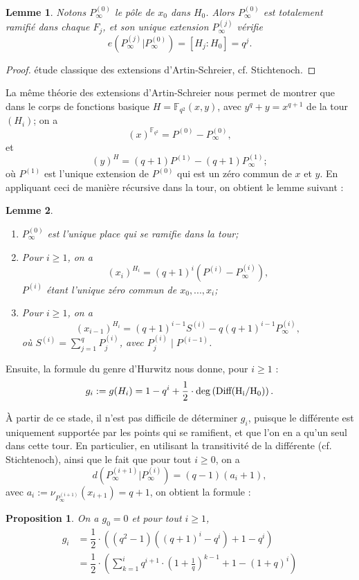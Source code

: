 \documentclass[10pt]{article}
\newtheorem{prop1}{Proposition}[]
\newtheorem{lem1}{Lemme}[]
\newcommand{\cd}{\cdot}
\begin{document}
\begin{lem1}
Notons $P_{\infty}^{(0)}$ le pôle de $x_0$ dans $H_0$. Alors $P_{\infty}^{(0)}$ est totalement ramifié dans chaque $F_j$, et son unique extension $P_{\infty}^{(j)}$ vérifie 
\[e(P_{\infty}^{(j)}|P_{\infty}^{(0)}) = [H_j:H_0]=q^j.\]
\end{lem1}

\begin{proof}
étude classique des extensions d'Artin-Schreier, cf. Stichtenoch.
\end{proof}

La même théorie des extensions d'Artin-Schreier nous permet de montrer que dans le corps de fonctions basique $H=\mathbb{F}_{q^2}(x,y)$, avec $y^q+y=x^{q+1}$ de la tour $(H_i)$; on a 
\[(x)^{\mathbb{F}_{q^2}} = P^{(0)} - P^{(0)}_{\infty},\]
et
\[(y)^H = (q+1)P^{(1)} - (q+1)P^{(1)}_{\infty};\]
où $P^{(1)}$ est l'unique extension de $P^{(0)}$ qui est un zéro commun de $x$ et $y$.
En appliquant ceci de manière récursive dans la tour, on obtient le lemme suivant :

\begin{lem1}
\begin{enumerate}
\item $P_{\infty}^{(0)}$ est l'unique place qui se ramifie dans la tour;
\item Pour $i \geq 1$, on a 
\[(x_i)^{H_i} = (q+1)^i \left(P^{(i)} - P_{\infty}^{(i)}\right),\]
$P^{(i)}$ étant l'unique zéro commun de $x_0,...,x_i$;
\item Pour $i \geq 1$, on a 
\[(x_{i-1})^{H_i} = (q+1)^{i-1}S^{(i)} - q(q+1)^{i-1}P_{\infty}^{(i)},\]
où $S^{(i)} = \sum\limits_{j=1}^q P_j^{(i)}$, avec $P_j^{(i)} \mid P^{(i-1)}$.
\end{enumerate}
\end{lem1}

Ensuite, la formule du genre d'Hurwitz nous donne, pour $i \geq 1$ :
\[g_i := g(H_i) = 1-q^i + \dfrac{1}{2} \cd \rm{deg}\left(Diff(H_i/H_0)\right).\]

À partir de ce stade, il n'est pas difficile de déterminer $g_i$, puisque le différente est uniquement supportée par les points qui se ramifient, et que l'on en a qu'un seul dans cette tour. En particulier, en utilisant la transitivité de la différente (cf. Stichtenoch), ainsi que le fait que pour tout $i \geq 0$, on a 
\[d(P^{(i+1)}_{\infty} | P^{(i)}_{\infty}) = (q-1)(a_i+1),\]
avec $a_i := \nu_{P^{(i+1)}_{\infty}}(x_{i+1}) = q+1$, on obtient la formule :


\begin{prop1}
On a $g_0=0$ et pour tout $i\geq 1$,
\begin{align*}
g_i &= \dfrac{1}{2} \cd ((q^2-1)((q+1)^i-q^i)+1-q^i) \\
 &=\dfrac{1}{2} \cd \left(\sum\limits_{k=1}^i q^{i+1} \cd \left(1+\frac{1}{q}\right)^{k-1} +1 -(1+q)^i\right)
\end{align*}
\end{prop1}
\end{document}
